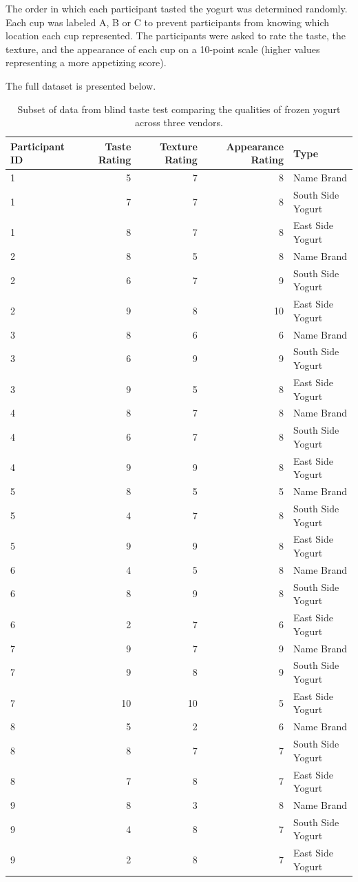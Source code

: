 \documentclass[
]{book}
\theoremstyle{plain}
\theoremstyle{mydefn}
\theoremstyle{myexmpl}
\theoremstyle{remark}
\begin{document}
The order in which each participant tasted the yogurt was determined randomly. Each cup was labeled A, B or C to prevent participants from knowing which location each cup represented. The participants were asked to rate the taste, the texture, and the appearance of each cup on a 10-point scale (higher values representing a more appetizing score).

The full dataset is presented below.

\begin{table}

\caption{\label{tab:caseyogurt-table}Subset of data from blind taste test comparing the qualities of frozen yogurt across three vendors.}
\centering
\begin{tabular}[t]{l|r|r|r|l}
\hline
Participant ID & Taste Rating & Texture Rating & Appearance Rating & Type\\
\hline
1 & 5 & 7 & 8 & Name Brand\\
\hline
1 & 7 & 7 & 8 & South Side Yogurt\\
\hline
1 & 8 & 7 & 8 & East Side Yogurt\\
\hline
2 & 8 & 5 & 8 & Name Brand\\
\hline
2 & 6 & 7 & 9 & South Side Yogurt\\
\hline
2 & 9 & 8 & 10 & East Side Yogurt\\
\hline
3 & 8 & 6 & 6 & Name Brand\\
\hline
3 & 6 & 9 & 9 & South Side Yogurt\\
\hline
3 & 9 & 5 & 8 & East Side Yogurt\\
\hline
4 & 8 & 7 & 8 & Name Brand\\
\hline
4 & 6 & 7 & 8 & South Side Yogurt\\
\hline
4 & 9 & 9 & 8 & East Side Yogurt\\
\hline
5 & 8 & 5 & 5 & Name Brand\\
\hline
5 & 4 & 7 & 8 & South Side Yogurt\\
\hline
5 & 9 & 9 & 8 & East Side Yogurt\\
\hline
6 & 4 & 5 & 8 & Name Brand\\
\hline
6 & 8 & 9 & 8 & South Side Yogurt\\
\hline
6 & 2 & 7 & 6 & East Side Yogurt\\
\hline
7 & 9 & 7 & 9 & Name Brand\\
\hline
7 & 9 & 8 & 9 & South Side Yogurt\\
\hline
7 & 10 & 10 & 5 & East Side Yogurt\\
\hline
8 & 5 & 2 & 6 & Name Brand\\
\hline
8 & 8 & 7 & 7 & South Side Yogurt\\
\hline
8 & 7 & 8 & 7 & East Side Yogurt\\
\hline
9 & 8 & 3 & 8 & Name Brand\\
\hline
9 & 4 & 8 & 7 & South Side Yogurt\\
\hline
9 & 2 & 8 & 7 & East Side Yogurt\\
\hline
\end{tabular}
\end{table}
\end{document}
